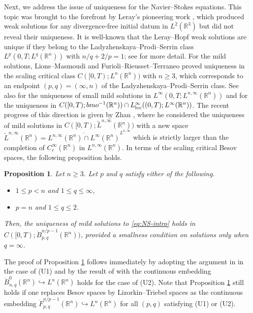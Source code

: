 \documentclass[a4paper,12pt,reqno]{amsart}
\theoremstyle{plain}
\newtheorem{prop}[thm]{Proposition}
\theoremstyle{definition}
\newcommand{\dB}{\dot{B}}
\renewcommand{\leq}{\leqslant}
\renewcommand{\geq}{\geqslant}
\newcommand{\R}{\mathbb{R}}
\begin{document}
Next, we address the issue of uniqueness for the Navier--Stokes equations. This topic was brought to the forefront by Leray's pioneering work \cite{Leray-1934-Acta}, which produced weak solutions for any divergence-free initial datum in $L^2(\R^3)$ but did not reveal their uniqueness.
It is well-known that the Leray--Hopf weak solutions are unique if they belong to the Ladyzhenskaya--Prodi--Serrin class $L^p(0,T;L^q(\R^n))$ with $n/q+2/p=1$; see \cites{Serrin-1963,Masuda-1984,Escauriaza-Seregin-Sverak-2003,Kozono-Sohr-1996} for more detail.
For the mild solutions, Lions--Masmoudi \cite{Lio-Mas} and Furioli--Rieusset--Terraneo \cite{Fur-Rie-Ter-2000} proved uniqueness in the scaling critical class $C([0,T);L^n(\R^n))$ with $n \geq 3$, which corresponds to an endpoint $(p,q)=(\infty,n)$ of the Ladyzhenskaya--Prodi--Serrin class.
See also \cite{Yam-2000} for the uniqueness of small mild solutions in $L^{\infty}(0,T;L^{n,\infty}(\R^n))$ and \cite{Miu-2005} for the uniqueness in $C([0,T);bmo^{-1}(\R^n)) \cap L^{\infty}_{\rm loc}((0,T);L^{\infty}(\R^n))$.
The recent progress of this direction is given by Zhan \cite{arXiv:2402.01174v2}, where he considered the uniqueness of mild solutions in $C([0,T);\widetilde{L}^{n,\infty}(\R^n))$ with a new space $\widetilde{L}^{n,\infty}(\R^n)=\overline{L^{n,\infty}(\R^n) \cap L^{\infty}(\R^n)}^{L^{n,\infty}}$ which is strictly larger than the completion of $C_c^{\infty}(\R^n)$ in $L^{n,\infty}(\R^n)$.
In terms of the scaling critical Besov spaces, the following proposition holds.
\begin{prop}\label{prop:uniq}
    Let $n \geq 3$.
    Let $p$ and $q$ satisfy either of the following.
    \begin{itemize}
        \item [\rm (U1)] $1 \leq p < n$ and $1 \leq q \leq \infty$,
        \item [\rm (U2)] $p=n$ and $1 \leq q \leq 2$.
    \end{itemize}
    Then, the uniqueness of mild solutions to \eqref{eq:NS-intro} holds in $C([0,T);\dB_{p,q}^{n/p-1}(\R^n))$, provided a smallness condition on solutions only when $q=\infty$.
\end{prop}
The proof of Proposition \ref{prop:uniq} follows immediately by adopting the argument in \cites{Fur-Rie-Ter-2000,Fuj-AIPHC,Iwabuchi-Okazaki-2025} in the case of (U1) and by the result of \cite{Fur-Rie-Ter-2000} with the continuous embedding $\dB_{n,q}^0(\R^n) \hookrightarrow L^n(\R^n)$ holds for the case of (U2).
Note that Proposition \ref{prop:uniq} still holds if one replaces Besov spaces by Lizorkin--Triebel spaces as the continuous embedding $\dot{F}_{p,q}^{n/p-1}(\R^n) \hookrightarrow L^n(\R^n)$ for all $(p,q)$ satisfying (U1) or (U2).
\end{document}
